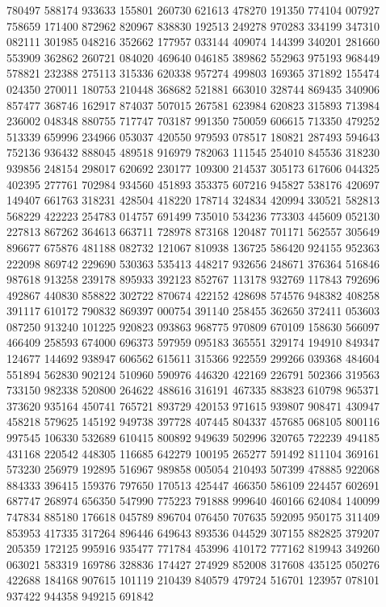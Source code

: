 {780497 588174 933633 155801 260730 621613 478270 191350 774104 007927 758659%
171400 872962 820967 838830 192513 249278 970283 334199 347310 082111 301985%
048216 352662 177957 033144 409074 144399 340201 281660 553909 362862 260721%
084020 469640 046185 389862 552963 975193 968449 578821 232388 275113 315336%
620338 957274 499803 169365 371892 155474 024350 270011 180753 210448 368682%
521881 663010 328744 869435 340906 857477 368746 162917 874037 507015 267581%
623984 620823 315893 713984 236002 048348 880755 717747 703187 991350 750059%
606615 713350 479252 513339 659996 234966 053037 420550 979593 078517 180821%
287493 594643 752136 936432 888045 489518 916979 782063 111545 254010 845536%
318230 939856 248154 298017 620692 230177 109300 214537 305173 617606 044325%
402395 277761 702984 934560 451893 353375 607216 945827 538176 420697 149407%
661763 318231 428504 418220 178714 324834 420994 330521 582813 568229 422223%
254783 014757 691499 735010 534236 773303 445609 052130 227813 867262 364613%
663711 728978 873168 120487 701171 562557 305649 896677 675876 481188 082732%
121067 810938 136725 586420 924155 952363 222098 869742 229690 530363 535413%
448217 932656 248671 376364 516846 987618 913258 239178 895933 392123 852767%
113178 932769 117843 792696 492867 440830 858822 302722 870674 422152 428698%
574576 948382 408258 391117 610172 790832 869397 000754 391140 258455 362650%
372411 053603 087250 913240 101225 920823 093863 968775 970809 670109 158630%
566097 466409 258593 674000 696373 597959 095183 365551 329174 194910 849347%
124677 144692 938947 606562 615611 315366 922559 299266 039368 484604 551894%
562830 902124 510960 590976 446320 422169 226791 502366 319563 733150 982338%
520800 264622 488616 316191 467335 883823 610798 965371 373620 935164 450741%
765721 893729 420153 971615 939807 908471 430947 458218 579625 145192 949738%
397728 407445 804337 457685 068105 800116 997545 106330 532689 610415 800892%
949639 502996 320765 722239 494185 431168 220542 448305 116685 642279 100195%
265277 591492 811104 369161 573230 256979 192895 516967 989858 005054 210493%
507399 478885 922068 884333 396415 159376 797650 170513 425447 466350 586109%
224457 602691 687747 268974 656350 547990 775223 791888 999640 460166 624084%
140099 747834 885180 176618 045789 896704 076450 707635 592095 950175 311409%
853953 417335 317264 896446 649643 893536 044529 307155 882825 379207 205359%
172125 995916 935477 771784 453996 410172 777162 819943 349260 063021 583319%
169786 328836 174427 274929 852008 317608 435125 050276 422688 184168 907615%
101119 210439 840579 479724 516701 123957 078101 937422 944358 949215 691842%
}
